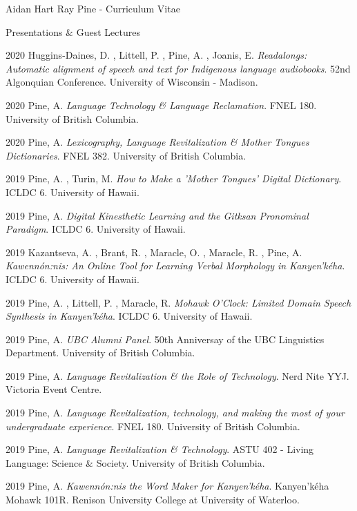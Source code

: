 \documentclass[12pt]{letter}
\begin{document}
\begin{cv}{ Aidan Hart Ray Pine  \space - \space   Curriculum Vitae}
        \begin{cvlist}{Presentations \& Guest Lectures}
                    \item[2020]  Huggins-Daines,  D. ,  Littell,  P. ,  Pine,  A. ,  Joanis,  E.   \textit{Readalongs: Automatic alignment of speech and text for Indigenous language audiobooks}. 52nd Algonquian Conference. University of Wisconsin - Madison.  
                    \item[2020]  Pine,  A.   \textit{Language Technology \& Language Reclamation}. FNEL 180. University of British Columbia.  
                    \item[2020]  Pine,  A.   \textit{Lexicography, Language Revitalization \& Mother Tongues Dictionaries}. FNEL 382. University of British Columbia.  
                    \item[2019]  Pine,  A. ,  Turin,  M.   \textit{How to Make a 'Mother Tongues' Digital Dictionary}. ICLDC 6. University of Hawaii.  
                    \item[2019]  Pine,  A.   \textit{Digital Kinesthetic Learning and the Gitksan Pronominal Paradigm}. ICLDC 6. University of Hawaii.  
                    \item[2019]  Kazantseva,  A. ,  Brant,  R. ,  Maracle,  O. ,  Maracle,  R. ,  Pine,  A.   \textit{Kawenn{\'o}n:nis: An Online Tool for Learning Verbal Morphology in Kanyen'k{\'e}ha}. ICLDC 6. University of Hawaii.  
                    \item[2019]  Pine,  A. ,  Littell,  P. ,  Maracle,  R.   \textit{Mohawk O'Clock: Limited Domain Speech Synthesis in Kanyen'k{\'e}ha}. ICLDC 6. University of Hawaii.  
                    \item[2019]  Pine,  A.   \textit{UBC Alumni Panel}. 50th Anniversay of the UBC Linguistics Department. University of British Columbia.  
                    \item[2019]  Pine,  A.   \textit{Language Revitalization \& the Role of Technology}. Nerd Nite YYJ. Victoria Event Centre.  
                    \item[2019]  Pine,  A.   \textit{Language Revitalization, technology, and making the most of your undergraduate experience}. FNEL 180. University of British Columbia.  
                    \item[2019]  Pine,  A.   \textit{Language Revitalization \& Technology}. ASTU 402 - Living Language: Science \& Society. University of British Columbia.  
                    \item[2019]  Pine,  A.   \textit{Kawenn{\'o}n:nis the Word Maker for Kanyen'k{\'e}ha}. Kanyen'k{\'e}ha Mohawk 101R. Renison University College at University of Waterloo.  

\end{cvlist}
\end{cv}
\end{document}
